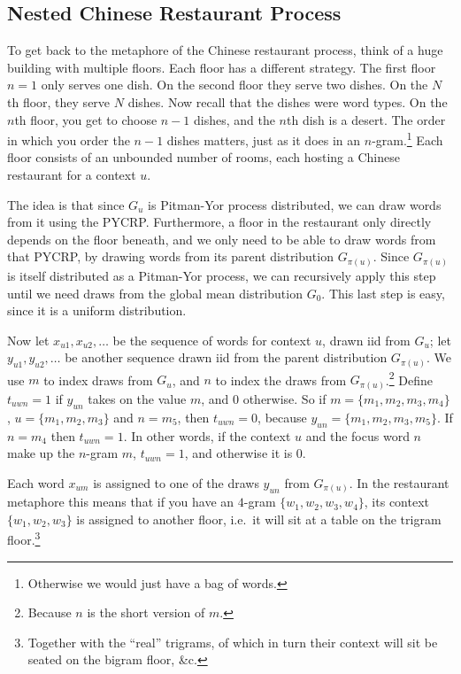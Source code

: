 \subsection{Nested Chinese Restaurant Process}
To get back to the metaphore of the Chinese restaurant process, think of a huge building with multiple floors. Each floor has a different strategy. The first floor $n=1$ only serves one dish. On the second floor they serve two dishes. On the $N$th floor, they serve $N$ dishes. Now recall that the dishes were word types. On the $n$th floor, you get to choose $n-1$ dishes, and the $n$th dish is a desert. The order in which you order the $n-1$ dishes matters, just as it does in an $n$-gram.\footnote{Otherwise we would just have a bag of words.} Each floor consists of an unbounded number of rooms, each hosting a Chinese restaurant for a context $u$.

The idea is that since $G_u$ is Pitman-Yor process distributed, we can draw words from it using the PYCRP. Furthermore, a floor in the restaurant only directly depends on the floor beneath, and we only need to be able to draw words from that PYCRP, by drawing words from its parent distribution $G_{\pi(u)}$. Since $G_{\pi(u)}$ is itself distributed as a Pitman-Yor process, we can recursively apply this step until we need draws from the global mean distribution $G_0$. This last step is easy, since it is a uniform distribution.

Now let $x_{u1},x_{u2},\ldots$ be the sequence of words for context $u$, drawn iid from $G_u$; let $y_{u1},y_{u2},\ldots$ be another sequence drawn iid from the parent distribution $G_{\pi(u)}$. We use $m$ to index draws from $G_u$, and $n$ to index the draws from $G_{\pi(u)}$.\footnote{Because $n$ is the short version of $m$.} Define $t_{uwn}=1$ if $y_{un}$ takes on the value $m$, and $0$ otherwise. So if $m=\{m_1, m_2, m_3, m_4\}$, $u=\{m_1, m_2, m_3\}$ and $n=m_5$, then $t_{uwn} = 0$, because $y_{un} = \{m_1,m_2,m_3,m_5\}$. If $n=m_4$ then $t_{uwn} = 1$. In other words, if the context $u$ and the focus word $n$ make up the $n$-gram $m$, $t_{uwn} =1$, and otherwise it is $0$.

Each word $x_{um}$ is assigned to one of the draws $y_{un}$ from $G_{\pi(u)}$. In the restaurant metaphore this means that if you have an $4$-gram $\{w_1,w_2,w_3,w_4\}$, its context $\{w_1,w_2,w_3\}$ is assigned to another floor, i.e.~it will sit at a table on the trigram floor.\footnote{Together with the ``real'' trigrams, of which in turn their context will sit be seated on the bigram floor, \&c.}


